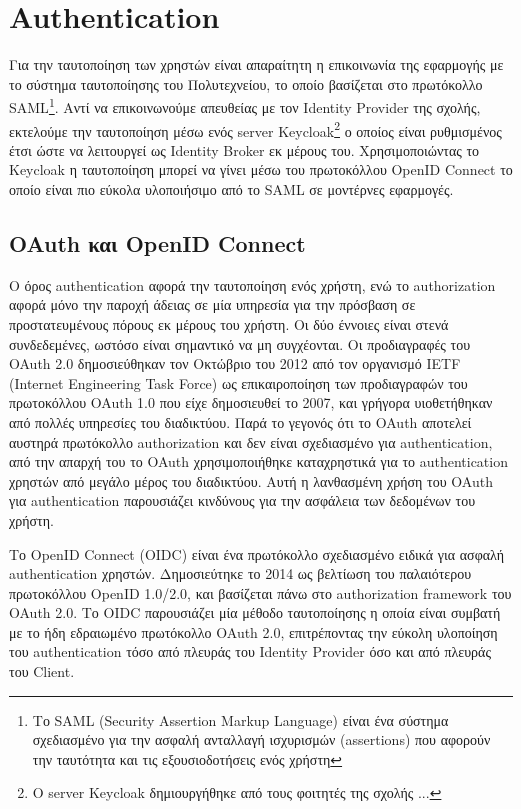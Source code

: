 \documentclass[../thesis.tex]{subfiles}
\begin{document}
\section*{Authentication}
Για την ταυτοποίηση των χρηστών είναι απαραίτητη η επικοινωνία της εφαρμογής με το σύστημα ταυτοποίησης του Πολυτεχνείου, το οποίο βασίζεται στο πρωτόκολλο SAML\footnote{Το SAML (Security Assertion Markup Language) είναι ένα σύστημα σχεδιασμένο για την ασφαλή ανταλλαγή ισχυρισμών (assertions) που αφορούν την ταυτότητα και τις εξουσιοδοτήσεις ενός χρήστη}.
Αντί να επικοινωνούμε απευθείας με τον Identity Provider της σχολής, εκτελούμε την ταυτοποίηση μέσω ενός server Keycloak\footnote{Ο server Keycloak δημιουργήθηκε από τους φοιτητές της σχολής ... } ο οποίος είναι ρυθμισμένος έτσι ώστε να λειτουργεί ως Identity Broker εκ μέρους του.
Χρησιμοποιώντας το Keycloak η ταυτοποίηση μπορεί να γίνει μέσω του πρωτοκόλλου OpenID Connect το οποίο είναι πιο εύκολα υλοποιήσιμο από το SAML σε μοντέρνες εφαρμογές.

\subsection*{OAuth και OpenID Connect}
Ο όρος authentication αφορά την ταυτοποίηση ενός χρήστη, ενώ το authorization αφορά μόνο την παροχή άδειας σε μία υπηρεσία για την πρόσβαση σε προστατευμένους πόρους εκ μέρους του χρήστη.
Οι δύο έννοιες είναι στενά συνδεδεμένες, ωστόσο είναι σημαντικό να μη συγχέονται.
Οι προδιαγραφές του OAuth 2.0 δημοσιεύθηκαν τον Οκτώβριο του 2012 από τον οργανισμό IETF (Internet Engineering Task Force) ως επικαιροποίηση των προδιαγραφών του πρωτοκόλλου OAuth 1.0 που είχε δημοσιευθεί το 2007, και γρήγορα υιοθετήθηκαν από πολλές υπηρεσίες του διαδικτύου.
Παρά το γεγονός ότι το OAuth αποτελεί αυστηρά πρωτόκολλο authorization και δεν είναι σχεδιασμένο για authentication, από την απαρχή του το OAuth χρησιμοποιήθηκε καταχρηστικά για το authentication χρηστών από μεγάλο μέρος του διαδικτύου.
Αυτή η λανθασμένη χρήση του OAuth για authentication παρουσιάζει κινδύνους για την ασφάλεια των δεδομένων του χρήστη\cite{oauth_net}.

Το OpenID Connect (OIDC) είναι ένα πρωτόκολλο σχεδιασμένο ειδικά για ασφαλή authentication χρηστών.
Δημοσιεύτηκε το 2014 ως βελτίωση του παλαιότερου πρωτοκόλλου OpenID 1.0/2.0, και βασίζεται πάνω στο authorization framework του OAuth 2.0.
Το OIDC παρουσιάζει μία μέθοδο ταυτοποίησης η οποία είναι συμβατή με το ήδη εδραιωμένο πρωτόκολλο OAuth 2.0, επιτρέποντας την εύκολη υλοποίηση του authentication τόσο από πλευράς του Identity Provider όσο και από πλευράς του Client\cite{oidc_faq}.
\end{document}
